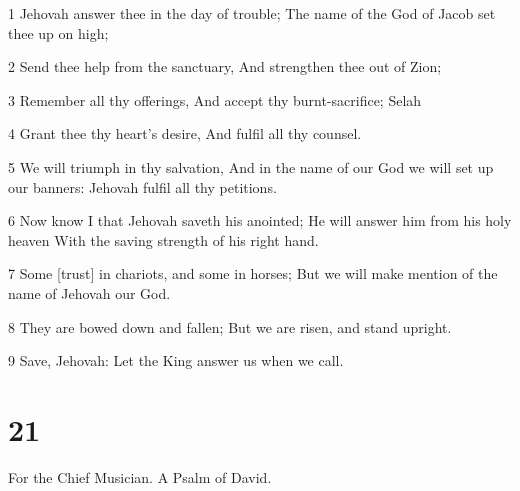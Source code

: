 \par 1 Jehovah answer thee in the day of trouble; The name of the God of Jacob set thee up on high;
\par 2 Send thee help from the sanctuary, And strengthen thee out of Zion;
\par 3 Remember all thy offerings, And accept thy burnt-sacrifice; Selah
\par 4 Grant thee thy heart's desire, And fulfil all thy counsel.
\par 5 We will triumph in thy salvation, And in the name of our God we will set up our banners: Jehovah fulfil all thy petitions.
\par 6 Now know I that Jehovah saveth his anointed; He will answer him from his holy heaven With the saving strength of his right hand.
\par 7 Some [trust] in chariots, and some in horses; But we will make mention of the name of Jehovah our God.
\par 8 They are bowed down and fallen; But we are risen, and stand upright.
\par 9 Save, Jehovah: Let the King answer us when we call.

\chapter{21}

\par For the Chief Musician. A Psalm of David.

